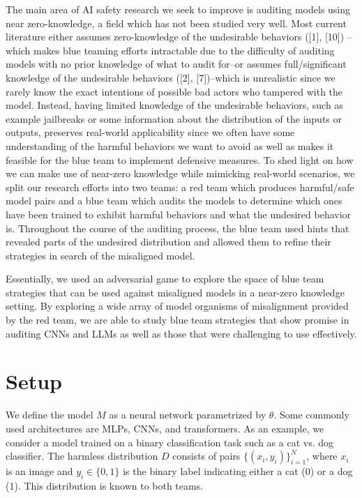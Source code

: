 \documentclass[letterpaper]{article} %
\begin{document}
The main area of AI safety research we seek to improve is auditing models using near zero-knowledge, a field which has not been studied very well. Most current literature either assumes zero-knowledge of the undesirable behaviors ([1], [10]) –which makes blue teaming efforts intractable due to the difficulty of auditing models with no prior knowledge of what to audit for–or assumes full/significant knowledge of the undesirable behaviors ([2], [7])–which is unrealistic since we rarely know the exact intentions of possible bad actors who tampered with the model. Instead, having limited knowledge of the undesirable behaviors, such as example jailbreaks or some information about the distribution of the inputs or outputs, preserves real-world applicability since we often have some understanding of the harmful behaviors we want to avoid as well as makes it feasible for the blue team to implement defensive measures.
To shed light on how we can make use of near-zero knowledge while mimicking real-world scenarios, we split our research efforts into two teams: a red team which produces harmful/safe model pairs and a blue team which audits the models to determine which ones have been trained to exhibit harmful behaviors and what the undesired behavior is. Throughout the course of the auditing process, the blue team used hints that revealed parts of the undesired distribution and allowed them to refine their strategies in search of the misaligned model.

Essentially, we used an adversarial game to explore the space of blue team strategies that can be used against misaligned models in a near-zero knowledge setting. By exploring a wide array of model organisms of misalignment provided by the red team, we are able to study blue team strategies that show promise in auditing CNNs and LLMs as well as those that were challenging to use effectively.

\section{Setup}
We define the model $M$ as a neural network parametrized by $\theta$. Some commonly used architectures are MLPs, CNNs, and transformers. As an example, we consider a model trained on a binary classification task such as a cat vs. dog classifier. The harmless distribution $D$ consists of pairs $\{(x_i, y_i)\}_{i=1}^{N}$, where $x_i$ is an image and $y_i \in \{0, 1\}$ is the binary label indicating either a cat (0) or a dog (1). This distribution is known to both teams.
\end{document}

